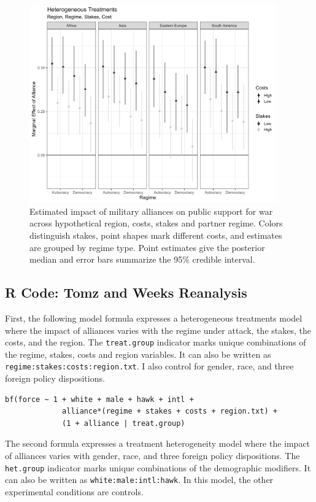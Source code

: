 \documentclass[12pt]{article}
\begin{document}
\begin{figure}[htpb]
	\centering
		\includegraphics[width=0.95\textwidth]{tw-het-treat.png}
	\caption{Estimated impact of military alliances on public support for war across hypothetical region, costs, stakes and partner regime. Colors distinguish stakes, point shapes mark different costs, and estimates are grouped by regime type. Point estimates give the posterior median and error bars summarize the 95\% credible interval.}
	\label{fig:tw-het-treat}
\end{figure}


\subsection{R Code: Tomz and Weeks Reanalysis}

First, the following model formula expresses a heterogeneous treatments model where the impact of alliances varies with the regime under attack, the stakes, the costs, and the region. 
The \verb+treat.group+ indicator marks unique combinations of the regime, stakes, costs and region variables. 
It can also be written as \verb+regime:stakes:costs:region.txt+. 
I also control for gender, race, and three foreign policy dispositions. 

\begin{verbatim}
bf(force ~ 1 + white + male + hawk + intl + 
             alliance*(regime + stakes + costs + region.txt) + 
             (1 + alliance | treat.group) 
\end{verbatim}


The second formula expresses a treatment heterogeneity model where the impact of alliances varies with gender, race, and three foreign policy dispositions. 
The \verb+het.group+ indicator marks unique combinations of the demographic modifiers.
It can also be written as \verb+white:male:intl:hawk+. 
In this model, the other experimental conditions are controls. 
\end{document}
